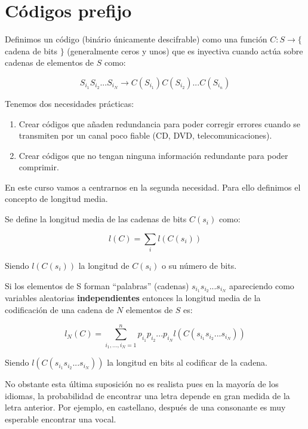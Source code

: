\newpage
\section{Códigos prefijo}

	\begin{defn}[Código]
		Definimos un código (binário únicamente descifrable) como una función $C: S \rightarrow \{ $ cadena de bits $ \} $ (generalmente ceros y unos) que es inyectiva cuando actúa sobre cadenas de elementos de $S$ como:

		$$ S_{i_1} S_{i_2} ... S_{i_N} \rightarrow C(S_{i_1}) C(S_{i_2}) ... C(S_{i_n}) $$

	\end{defn}

	Tenemos dos necesidades prácticas:

	\begin{enumerate}
		\item Crear códigos que añaden redundancia para poder corregir errores cuando se transmiten por un canal poco fiable (CD, DVD, telecomunicaciones).

		\item Crear códigos que no tengan ninguna información redundante para poder comprimir.
	\end{enumerate}

	En este curso vamos a centrarnos en la segunda necesidad. Para ello definimos el concepto de longitud media.

	\begin{defn}
		Se define la longitud media de las cadenas de bits $C(s_i)$ como:

		$$ l(C) = \sum_i l(C(s_i))$$

		Siendo $l(C(s_i))$ la longitud de $C(s_i)$ o su número de bits.
	\end{defn}

	Si los elementos de S forman ``palabras'' (cadenas) $s_{i_1} s_{i_2} ... s_{i_N}$ apareciendo como variables aleatorias \textbf{independientes} entonces la longitud media de la codificación de una cadena de $N$ elementos de $S$ es:

	$$l_{N}(C) = \sum_{i_1,...,i_N = 1}^{n} p_{i_1} p_{i_2} ... p_{i_N} l(C(s_{i_1} s_{i_2} ... s_{i_N}))$$

	Siendo $l(C(s_{i_1} s_{i_2} ... s_{i_N}))$ la longitud en bits al codificar de la cadena.

	No obstante esta última suposición no es realista pues en la mayoría de los idiomas, la probabilidad de encontrar una letra depende en gran medida de la letra anterior. Por ejemplo, en castellano, después de una consonante es muy esperable encontrar una vocal.

